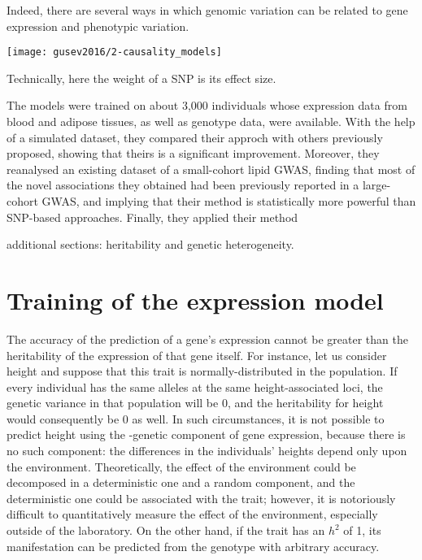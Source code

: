 \documentclass[../main.tex]{subfiles}
\begin{document}
Indeed, there are several ways in which genomic variation can be related 
to gene expression and phenotypic variation.

\begin{marginfigure}[-2cm]
	\texttt{[image: gusev2016/2-causality\_models]}
	\caption{}
\end{marginfigure}

Technically, here the weight of a SNP is its effect size.

The models were trained on about 3,000 individuals whose expression data 
from blood and adipose tissues, as well as genotype data, were 
available. With the help of a simulated dataset, they compared their 
approch with others previously proposed, showing that theirs is a 
significant improvement. Moreover, they reanalysed an existing dataset 
of a small-cohort lipid GWAS, finding that most of the novel 
associations they obtained had been previously reported in a 
large-cohort GWAS, and implying that their method is statistically more 
powerful than SNP-based approaches. Finally, they applied their method 

additional sections: heritability and genetic heterogeneity.

\section{Training of the expression model}

The accuracy of the prediction of a gene's expression cannot be greater 
than the heritability 
of the expression of that gene itself. For instance, let us consider 
height and suppose that this trait is 
normally-distributed in the population. If every individual has the same 
alleles at the same height-associated loci, the genetic variance in that 
population will be 0, and the heritability for height would consequently 
be 0 as well. In such circumstances, it is not possible to predict 
height using the \cis-genetic component of gene expression, because 
there is no such component: the differences in the individuals' heights 
depend only upon the environment. Theoretically, the effect of the 
environment could be decomposed in a deterministic one and a random 
component, and the deterministic one could be associated with the trait; 
however, it is notoriously difficult to quantitatively measure the 
effect of the environment, especially outside of the laboratory. On the 
other hand, if the trait has an $h^2$ of 1, its manifestation can be 
predicted from the genotype with arbitrary accuracy.
\end{document}
